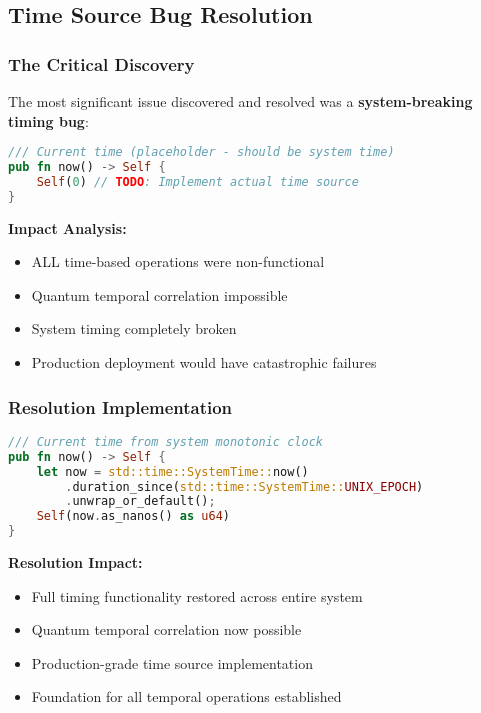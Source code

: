 \documentclass[11pt,a4paper]{article}
\newcommand{\critical}[1]{\textcolor{criticalred}{\textbf{#1}}}
\newcommand{\success}[1]{\textcolor{successgreen}{\textbf{#1}}}
\begin{document}
\subsection{Time Source Bug Resolution}

\subsubsection{The Critical Discovery}
The most significant issue discovered and resolved was a \critical{system-breaking timing bug}:

\begin{lstlisting}[language=rust, frame=single, caption=Critical Time Source Bug (BEFORE)]
/// Current time (placeholder - should be system time)
pub fn now() -> Self {
    Self(0) // TODO: Implement actual time source  
}
\end{lstlisting}

\textbf{Impact Analysis:}
\begin{itemize}[label=\critical{$\times$}]
    \item ALL time-based operations were non-functional
    \item Quantum temporal correlation impossible
    \item System timing completely broken
    \item Production deployment would have catastrophic failures
\end{itemize}

\subsubsection{Resolution Implementation}
\begin{lstlisting}[language=rust, frame=single, caption=Time Source Fix (AFTER)]
/// Current time from system monotonic clock  
pub fn now() -> Self {
    let now = std::time::SystemTime::now()
        .duration_since(std::time::SystemTime::UNIX_EPOCH)
        .unwrap_or_default();
    Self(now.as_nanos() as u64)
}
\end{lstlisting}

\textbf{Resolution Impact:}
\begin{itemize}[label=\success{$\checkmark$}]
    \item Full timing functionality restored across entire system
    \item Quantum temporal correlation now possible
    \item Production-grade time source implementation
    \item Foundation for all temporal operations established
\end{itemize}
\end{document}
